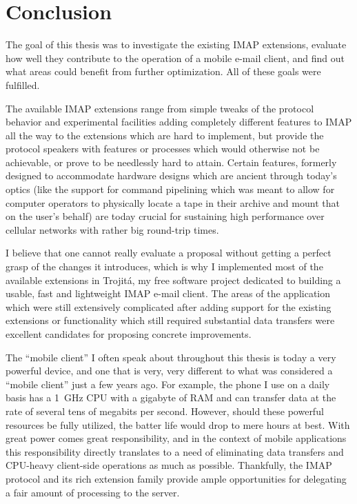 \documentclass[trojita]{subfiles}
\begin{document}
\chapter{Conclusion}
\label{sec:conclusion}

The goal of this thesis was to investigate the existing IMAP extensions, evaluate how well they contribute to the
operation of a mobile e-mail client, and find out what areas could benefit from further optimization.  All of these
goals were fulfilled.

The available IMAP extensions range from simple tweaks of the protocol behavior and experimental facilities adding
completely different features to IMAP all the way to the extensions which are hard to implement, but provide the
protocol speakers with features or processes which would otherwise not be achievable, or prove to be needlessly hard to
attain.  Certain features, formerly designed to accommodate hardware designs which are ancient through today's optics
(like the support for command pipelining which was meant to allow for computer operators to physically locate a tape in
their archive and mount that on the user's behalf) are today crucial for sustaining high performance over cellular
networks with rather big round-trip times.

I believe that one cannot really evaluate a proposal without getting a perfect grasp of the changes it introduces, which
is why I implemented most of the available extensions in Trojitá, my free software project dedicated to building a
usable, fast and lightweight IMAP e-mail client.  The areas of the application which were still extensively complicated
after adding support for the existing extensions or functionality which still required substantial data transfers were
excellent candidates for proposing concrete improvements.

The ``mobile client'' I often speak about throughout this thesis is today a very powerful device, and one that is very,
very different to what was considered a ``mobile client'' just a few years ago.  For example, the phone I use on a daily
basis has a 1~GHz CPU with a gigabyte of RAM and can transfer data at the rate of several tens of megabits per second.
However, should these powerful resources be fully utilized, the batter life would drop to mere hours at best.  With
great power comes great responsibility, and in the context of mobile applications this responsibility directly
translates to a need of eliminating data transfers and CPU-heavy client-side operations as much as possible.
Thankfully, the IMAP protocol and its rich extension family provide ample opportunities for delegating a fair amount of
processing to the server.
\end{document}
